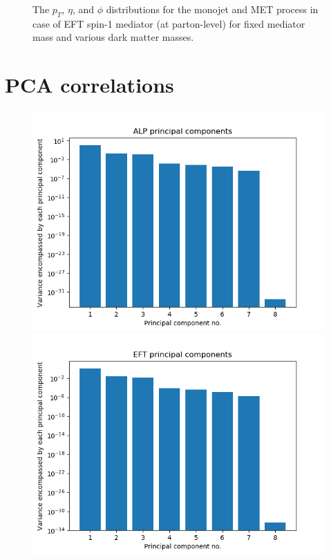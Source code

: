 \documentclass[prd,aps,letterpaper,floatfix,superscriptaddress,preprintnumbers,twocolumn,10pt,nofootinbib]{revtex4-1}
\begin{document}
\begin{figure} [H]
\begin{center}
\caption{The $p_T$, $\eta$,  and $\phi$ distributions for the monojet and MET process in case of EFT spin-1 mediator (at parton-level) for fixed mediator mass and  various dark matter masses.\label{spin1med}}
\end{center}
\end{figure}


\section{PCA correlations\label{PCA}}

\begin{figure} [H]
\centering
\includegraphics[scale=0.26]{figures/ALP_PCA.png}
\includegraphics[scale=0.26]{figures/EFT_PCA.png}

\end{figure}
\end{document}
